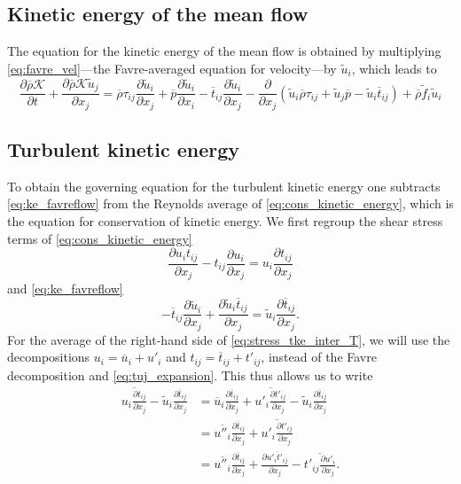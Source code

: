 \documentclass[oneside,a4paper,11pt]{report}
\newcommand{\rhoavg}{\overline{\rho}}
\newcommand{\pavg}{\overline{p}}
\newcommand{\tavg}{\overline{t}}
\newcommand{\uavg}{\overline{u}}
\newcommand{\tfluc}{t'}
\newcommand{\ufluc}{u'}
\newcommand{\rs}{\tau}          %
\newcommand{\favgf}{\widetilde{f}}
\newcommand{\uavgf}{\widetilde{u}}
\newcommand{\uflucf}{u''}
\begin{document}
\subsection{Kinetic energy of the mean flow}
The equation for the kinetic energy of the mean flow is obtained by multiplying \cref{eq:favre_vel}---the Favre-averaged equation for velocity---by $\uavgf_i$, which leads to
\begin{equation}
\label{eq:ke_favreflow}
\frac{ \partial \rhoavg \mathcal{K} }{ \partial t} + \frac{ \partial \rhoavg \mathcal{K} \uavgf_j }{ \partial x_j} = \rhoavg \rs_{ij} \frac{ \partial \uavgf_i }{ \partial x_j } + \pavg \frac{ \partial \uavgf_i }{ \partial x_i } - \tavg_{ij} \frac{ \partial \uavgf_i }{ \partial x_j } - \frac{\partial}{\partial x_j} \left ( \uavgf_i \rhoavg \rs_{ij} + \uavgf_j \pavg - \uavgf_i \tavg_{ij} \right ) + \rhoavg \favgf_i \uavgf_i
\end{equation}

\subsection{Turbulent kinetic energy}
To obtain the governing equation for the turbulent kinetic energy one subtracts \cref{eq:ke_favreflow} from the Reynolds average of \cref{eq:cons_kinetic_energy}, which is the equation for conservation of kinetic energy. We first regroup the shear stress terms of \cref{eq:cons_kinetic_energy}  
\begin{equation}
\label{eq:stress_tke_inter_T}
     \frac{\partial u_i t_{ij} }{\partial x_j} - t_{ij} \frac{\partial u_i}{\partial x_j} =  u_i \frac{\partial t_{ij} }{\partial x_j}
\end{equation}
and \cref{eq:ke_favreflow}
\begin{equation}
     -\tavg_{ij} \frac{ \partial \uavgf_i}{\partial x_j} + \frac{ \partial \uavgf_i \tavg_{ij} }{\partial x_j} = \uavgf_i \frac{ \partial \tavg_{ij} }{\partial x_j}.
\end{equation}
For the average of the right-hand side of \cref{eq:stress_tke_inter_T}, we will use the decompositions $u_i = \uavg_i + \ufluc_i$ and $t_{ij} = \tavg_{ij} + \tfluc_{ij}$, instead of the Favre decomposition and \cref{eq:tuj_expansion}. This thus allows us to write 
\begin{align}
\overline{ u_i \frac{\partial t_{ij} }{\partial x_j} } - \uavgf_i \frac{ \partial \tavg_{ij} }{\partial x_j} & = \uavg_i \frac{\partial \tavg_{ij} }{\partial x_j} + \overline{ \ufluc_i \frac{\partial \tfluc_{ij}}{\partial x_j} } - \uavgf_i \frac{\partial \tavg_{ij} }{\partial x_j} \nonumber \\
& = \overline{ \uflucf_i } \frac{\partial \tavg_{ij} }{\partial x_j} + \overline{ \ufluc_i \frac{\partial \tfluc_{ij} }{\partial x_j} } \nonumber \\
& = \overline{ \uflucf_i } \frac{\partial \tavg_{ij} }{\partial x_j} + \frac{\partial \overline{ \ufluc_i \tfluc_{ij} }}{\partial x_j} - \overline{ \tfluc_{ij} \frac{\partial \ufluc_i}{\partial x_j} }.
\end{align} 
\end{document}
